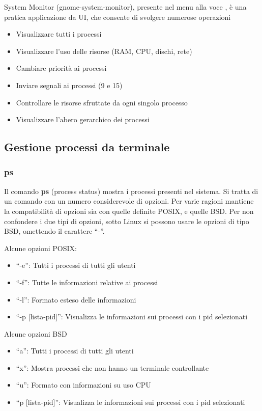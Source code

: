 System Monitor (gnome-system-monitor), presente nel menu alla voce , è una pratica applicazione da UI, che consente di svolgere numerose operazioni

\begin{itemize}
 \item Visualizzare tutti i processi
 \item Visualizzare l'uso delle risorse (RAM, CPU, dischi, rete)
 \item Cambiare priorità ai processi
 \item Inviare segnali ai processi (9 e 15)
 \item Controllare le risorse sfruttate da ogni singolo processo
 \item Visualizzare l'abero gerarchico dei processi
\end{itemize}


\subsection{Gestione processi da terminale}


\subsubsection{ps}

Il comando \textbf{ps} (process status) mostra i processi presenti nel sistema. Si tratta di un comando con un numero considerevole di opzioni. Per varie ragioni mantiene la compatibilità di opzioni sia con quelle definite POSIX, e quelle BSD. Per non confondere i due tipi di opzioni, sotto Linux si possono usare le opzioni di tipo BSD, omettendo il carattere ``-''. 

Alcune opzioni POSIX:

\begin{itemize}
 \item ``-e'': Tutti i processi di tutti gli utenti
 \item ``-f'': Tutte le informazioni relative ai processi
 \item ``-l'': Formato esteso delle informazioni
 \item ``-p [lista-pid]'': Visualizza le informazioni sui processi con i pid selezionati
\end{itemize}

Alcune opzioni BSD

\begin{itemize}
 \item ``a'': Tutti i processi di tutti gli utenti
 \item ``x'': Mostra processi che non hanno un terminale controllante
 \item ``u'': Formato con informazioni su uso CPU
 \item ``p [lista-pid]'': Visualizza le informazioni sui processi con i pid selezionati
\end{itemize}

